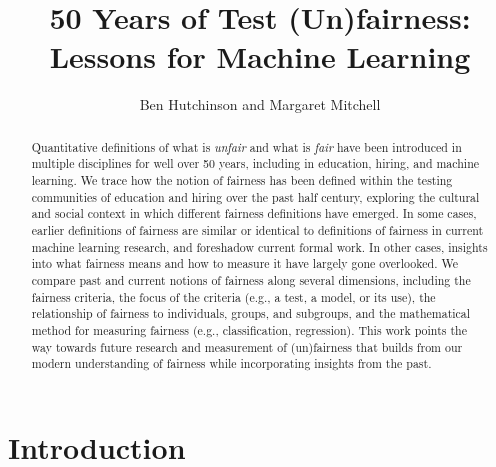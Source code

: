 \documentclass[sigconf,letterpaper,9pt]{acmart}
\begin{document}


\title{50 Years of Test (Un)fairness: Lessons for Machine Learning}

\author{Ben Hutchinson and  Margaret Mitchell}


\begin{abstract}
Quantitative definitions of what is {\em unfair} and what is {\em fair} have been introduced in multiple disciplines for well over 50 years, including in education, hiring, and machine learning.  We trace how the notion of fairness has been defined within the testing communities of education and hiring over the past half century, exploring the cultural and social context in which different fairness definitions have emerged.  In some cases, earlier definitions of fairness are similar or identical to definitions of fairness in current machine learning research, and foreshadow current formal work.  In other cases, insights into what fairness means and how to measure it have largely gone overlooked.  We compare past and current notions of fairness along several dimensions, including the fairness criteria, the focus of the criteria (e.g., a test, a model, or its use), the relationship of fairness to individuals, groups, and subgroups, and the mathematical method for measuring fairness (e.g., classification, regression). This work points the way towards future research and measurement of (un)fairness
that builds from our modern understanding of fairness while incorporating insights from the past.
\end{abstract}

\maketitle


\section{Introduction}
\end{document}
